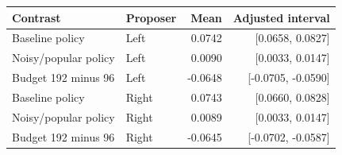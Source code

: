 \begin{tabular}{llrr}\toprule
Contrast & Proposer & Mean & Adjusted interval \\\midrule
Baseline policy & Left & 0.0742 & [0.0658, 0.0827] \\
Noisy/popular policy & Left & 0.0090 & [0.0033, 0.0147] \\
Budget 192 minus 96 & Left & -0.0648 & [-0.0705, -0.0590] \\
Baseline policy & Right & 0.0743 & [0.0660, 0.0828] \\
Noisy/popular policy & Right & 0.0089 & [0.0033, 0.0147] \\
Budget 192 minus 96 & Right & -0.0645 & [-0.0702, -0.0587] \\
\bottomrule\end{tabular}
